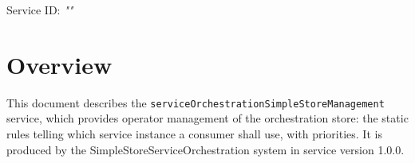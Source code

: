 \documentclass[a4paper]{arrowhead}
\begin{document}
\sloppy

\ArrowheadSetup

\begin{center}
  \vspace*{1cm}
  \huge{\arrowtitle}

  \vspace*{0.2cm}
  \LARGE{\arrowtype}
  \vspace*{1cm}

  \Large{Service ID: \textit{"\arrowid"}}

  \vspace*{\fill}


  \vspace*{1cm}
  \vspace*{\fill}

  \begin{abstract}
    This document describes the \texttt{service\allowbreak{}Orchestration\allowbreak{}Simple\allowbreak{}Store\allowbreak{}Management} service, version 1.0.0, produced by the SimpleStoreServiceOrchestration core system of Arrowhead 5.2.2.
  \end{abstract}

  \vspace*{1cm}
\end{center}

\newpage

\tableofcontents
\newpage

\section{Overview}
\label{sec:overview}

This document describes the \texttt{service\allowbreak{}Orchestration\allowbreak{}Simple\allowbreak{}Store\allowbreak{}Management} service, which provides operator management of the orchestration store: the static rules telling which service instance a consumer shall use, with priorities.
It is produced by the SimpleStoreServiceOrchestration system \cite{ssso-sysd} in service version 1.0.0.
\end{document}
